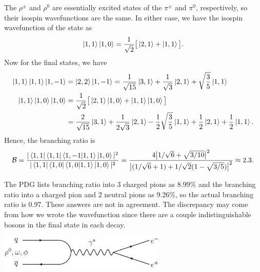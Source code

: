 The $\rho^{\pm}$ and $\rho^{0}$ are essentially excited states of the $\pi^{\pm}$ and $\pi^{0}$, respectively, so their isospin wavefunctions are the same.
In either case, we have the isospin wavefunction of the state as
\begin{eqnarray}
    \label{eq:rho-pi}
    \ket{1,1}\ket{1,0} = \frac{1}{\sqrt{2}} \big[ \ket{2,1} + \ket{1,1} \big]
.\end{eqnarray}
Now for the final states, we have
\begin{align}
    \label{eq:final-states}
    \ket{1,1}\ket{1,1}\ket{1,-1} &= \ket{2,2}\ket{1,-1} = \frac{1}{\sqrt{15}}\ket{3,1} + \frac{1}{\sqrt{3}}\ket{2,1} + \sqrt{\frac{3}{5}}\ket{1,1} \\
    \ket{1,1}\ket{1,0}\ket{1,0} &= \frac{1}{\sqrt{2}}\big[ \ket{2,1}\ket{1,0} + \ket{1,1}\ket{1,0} \big] \notag \\
                                &= \frac{2}{\sqrt{15}}\ket{3,1} + \frac{1}{2\sqrt{3}}\ket{2,1} - \frac{1}{2}\sqrt{\frac{3}{5}}\ket{1,1} + \frac{1}{2}\ket{2,1} + \frac{1}{2}\ket{1,1}
.\end{align}
Hence, the branching ratio is
\begin{eqnarray}
    \label{eq:B}
\mathcal{B} = \frac{|\bra{1,1}\bra{1,1}\bra{1,-1} \ket{1,1}\ket{1,0}|^2}{|\bra{1,1}\bra{1,0}\bra{1,0} \ket{1,1}\ket{1,0}|^2} = \frac{4\big| 1/\sqrt{6} + \sqrt{3/10} \big|^2}{\big|(1/\sqrt{6} + 1) + 1/\sqrt{2}(1 - \sqrt{3/5}) \big|^2} \approx 2.3
.\end{eqnarray}

The PDG lists branching ratio into 3 charged pions as 8.99\% and the branching ratio into a charged pion and 2 neutral pions as 9.26\%, so the actual branching ratio is $0.97$.
These answers are not in agreement.
The discrepancy may come from how we wrote the wavefunction since there are a couple indistinguishable bosons in the final state in each decay.


\begin{center}
    \includegraphics[width=0.6\textwidth]{prob5.eps} 
\end{center}


